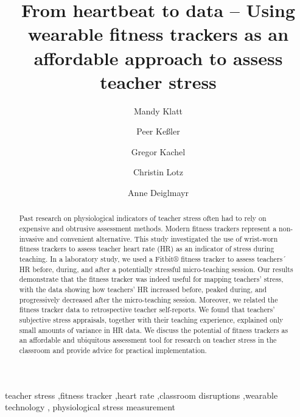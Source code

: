 \documentclass[preprint, 3p,
authoryear]{elsarticle} %
\begin{document}
\begin{frontmatter}

  \title{From heartbeat to data -- Using wearable fitness trackers as an
affordable approach to assess teacher stress}
    \author[Leipzig University]{Mandy Klatt%
  }
    \author[Leipzig University]{Peer Keßler%
  }
    \author[Leipzig University, Max Planck Institute for Evolutionary
Anthropology]{Gregor Kachel%
  }
    \author[Leipzig University]{Christin Lotz%
  }
    \author[Leipzig University]{Anne Deiglmayr%
  }
  
  \begin{abstract}
  Past research on physiological indicators of teacher stress often had
  to rely on expensive and obtrusive assessment methods. Modern fitness
  trackers represent a non-invasive and convenient alternative. This
  study investigated the use of wrist-worn fitness trackers to assess
  teacher heart rate (HR) as an indicator of stress during teaching. In
  a laboratory study, we used a Fitbit® fitness tracker to assess
  teachers´ HR before, during, and after a potentially stressful
  micro-teaching session. Our results demonstrate that the fitness
  tracker was indeed useful for mapping teachers' stress, with the data
  showing how teachers' HR increased before, peaked during, and
  progressively decreased after the micro-teaching session. Moreover, we
  related the fitness tracker data to retrospective teacher
  self-reports. We found that teachers' subjective stress appraisals,
  together with their teaching experience, explained only small amounts
  of variance in HR data. We discuss the potential of fitness trackers
  as an affordable and ubiquitous assessment tool for research on
  teacher stress in the classroom and provide advice for practical
  implementation.
  \end{abstract}
    \begin{keyword}
    teacher stress \sep fitness tracker \sep heart rate \sep classroom
disruptions \sep wearable technology \sep 
    physiological stress measurement
  \end{keyword}
  
 \end{frontmatter}
\end{document}
